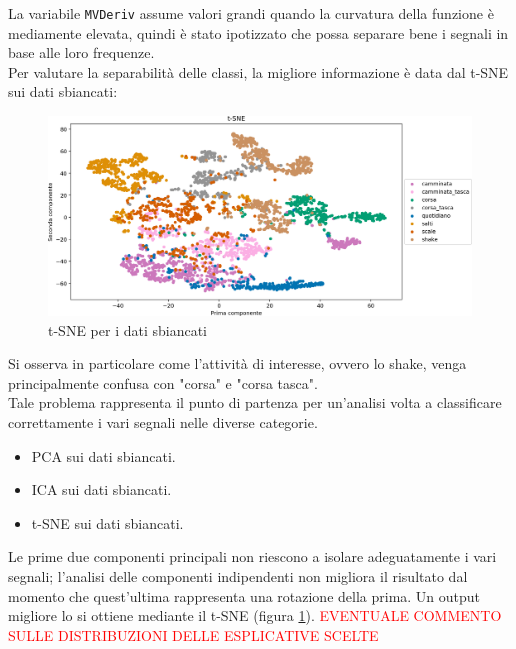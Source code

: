 \documentclass[./main.tex]{subfiles}
\begin{document}
La variabile \texttt{MVDeriv} assume valori grandi quando la curvatura della funzione è mediamente elevata, quindi è stato ipotizzato che possa separare bene i segnali in base alle loro frequenze.\\
Per valutare la separabilità delle classi, la migliore informazione è data dal t-SNE sui dati sbiancati:
\begin{figure}[H]
	\centering
	\includegraphics[width=.8\textwidth]{../../figure/t-SNE.png}
	\caption{{ t-SNE per i dati sbiancati}}
	\label{t-sne}
\end{figure}

Si osserva in particolare come l'attività di interesse, ovvero lo shake, venga principalmente confusa con "corsa" e "corsa tasca". 
\\
Tale problema rappresenta il punto di partenza per un'analisi volta a classificare correttamente i vari segnali nelle diverse categorie.

\begin{itemize}
	\item PCA sui dati sbiancati.
	\item ICA sui dati sbiancati.
	\item t-SNE sui dati sbiancati.
\end{itemize}
Le prime due componenti principali non riescono a isolare adeguatamente i vari segnali; l'analisi delle componenti indipendenti non migliora il risultato dal momento che quest'ultima rappresenta una rotazione della prima. Un output migliore lo si ottiene mediante il t-SNE (figura \ref{t-sne}). 
\textcolor{red}{EVENTUALE COMMENTO SULLE DISTRIBUZIONI DELLE ESPLICATIVE SCELTE}
\end{document}
